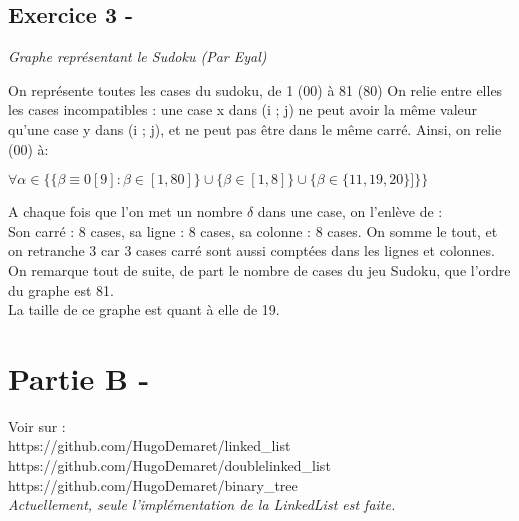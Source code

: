 \documentclass{article}
\begin{document}
\subsection*{Exercice 3 -}
\textit{Graphe représentant le Sudoku (Par Eyal)}
\begin{center}
\end{center}
\textsf{On représente toutes les cases du sudoku, de 1 (00) à 81 (80)}
\textsf{On relie entre elles les cases incompatibles : une case x dans (i ; j) ne peut avoir la même valeur qu'une case y dans (i ; j), et ne peut pas être dans le même carré.}
\textsf{Ainsi, on relie (00) à:}
\begin{center}
	$
		\forall \alpha \in \{\{\beta \equiv 0 [9] : \beta \in [1,80] \}\cup \{\beta \in [1,8]\} \cup \{\beta \in \{11,19,20\}]\}\}
	$
\end{center}
\textsf{A chaque fois que l'on met un nombre $\delta$ dans une case, on l'enlève de :}\\
\textsf{Son carré : 8 cases, sa ligne : 8 cases, sa colonne : 8 cases.}
\textsf{On somme le tout, et on retranche 3 car 3 cases carré sont aussi comptées dans les lignes et colonnes.}
\textsf{On remarque tout de suite, de part le nombre de cases du jeu Sudoku, que l'ordre du graphe est 81.}\\
\textsf{La taille de ce graphe est quant à elle de 19.}
\section*{Partie B -}
Voir sur :\\
	https://github.com/HugoDemaret/linked\_list\\
	https://github.com/HugoDemaret/doublelinked\_list\\
	https://github.com/HugoDemaret/binary\_tree\\
	\textit{Actuellement, seule l'implémentation de la LinkedList est faite.}
\end{document}
